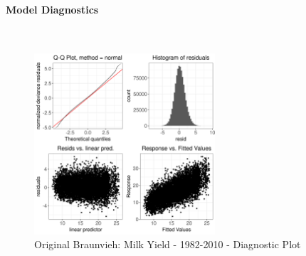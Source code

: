 \paragraph{Model Diagnostics} \quad \\
\begin{figure}[H]
    \centering
    \includegraphics[width=0.6\textwidth]{thesis/figures/models/milk/before2010/ob_milk_before2010/ob_milk_before2010_diagnostics.png}
    \caption[]{Original Braunvieh: Milk Yield - 1982-2010 - Diagnostic Plot}
\end{figure}

\newpage
